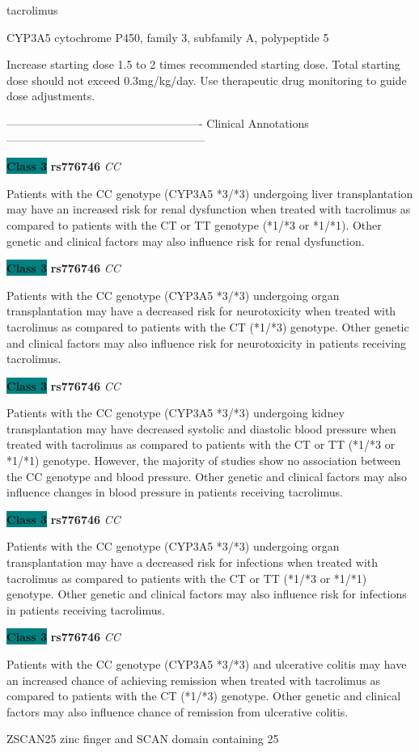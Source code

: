 \documentclass{resume} %
\begin{document}
\begin{rSection}{ tacrolimus }
\begin{rSubsection}{ CYP3A5 }{ cytochrome P450, family 3, subfamily A, polypeptide 5 }{}{}
\item[] Increase starting dose 1.5 to 2 times recommended starting dose. Total starting dose should not exceed 0.3mg/kg/day. Use therapeutic drug monitoring to guide dose adjustments.
\item[] ---------------------------------------------------- Clinical Annotations -----------------------------------------------------\newline
\item \textbf{\colorbox{teal} {Class 3}} \textbf{ rs776746 } \textit{ CC }
\item[] Patients with the CC genotype (CYP3A5 *3/*3) undergoing liver transplantation may have an increased risk for renal dysfunction when treated with tacrolimus as compared to patients with the CT or TT genotype (*1/*3 or *1/*1). Other genetic and clinical factors may also influence risk for renal dysfunction. \item \textbf{\colorbox{teal} {Class 3}} \textbf{ rs776746 } \textit{ CC }
\item[] Patients with the CC genotype (CYP3A5 *3/*3) undergoing organ transplantation may have a decreased risk for neurotoxicity when treated with tacrolimus as compared to patients with the CT (*1/*3) genotype. Other genetic and clinical factors may also influence risk for neurotoxicity in patients receiving tacrolimus. \item \textbf{\colorbox{teal} {Class 3}} \textbf{ rs776746 } \textit{ CC }
\item[] Patients with the CC genotype (CYP3A5 *3/*3) undergoing kidney transplantation may have decreased systolic and diastolic blood pressure when treated with tacrolimus as compared to patients with the CT or TT (*1/*3 or *1/*1) genotype. However, the majority of studies show no association between the CC genotype and blood pressure. Other genetic and clinical factors may also influence changes in blood pressure in patients receiving tacrolimus.\item \textbf{\colorbox{teal} {Class 3}} \textbf{ rs776746 } \textit{ CC }
\item[] Patients with the CC genotype (CYP3A5 *3/*3) undergoing organ transplantation may have a decreased risk for infections when treated with tacrolimus as compared to patients with the CT or TT (*1/*3 or *1/*1) genotype. Other genetic and clinical factors may also influence risk for infections in patients receiving tacrolimus.\item \textbf{\colorbox{teal} {Class 3}} \textbf{ rs776746 } \textit{ CC }
\item[] Patients with the CC genotype (CYP3A5 *3/*3) and ulcerative colitis may have an increased chance of achieving remission when treated with tacrolimus as compared to patients with the CT (*1/*3) genotype. Other genetic and clinical factors may also influence chance of remission from ulcerative colitis. 
\end{rSubsection}\begin{rSubsection}{ ZSCAN25 }{ zinc finger and SCAN domain containing 25 }{}{}
\item[]


\end{rSubsection}
\end{rSection}
\end{document}
